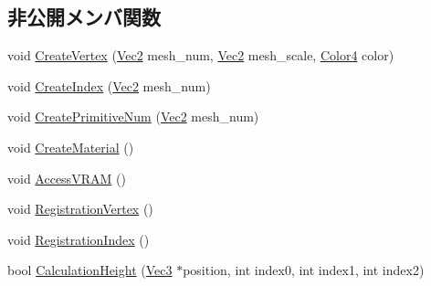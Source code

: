 \subsection*{非公開メンバ関数}
\begin{DoxyCompactItemize}
\item 
void \mbox{\hyperlink{class_mesh_plane_polygon_a50cdb56a3faa5d0bbb8ff75c3dcc2830}{Create\+Vertex}} (\mbox{\hyperlink{_vector3_d_8h_a5ef6e95dfc5f9d3820b71772d99bbc25}{Vec2}} mesh\+\_\+num, \mbox{\hyperlink{_vector3_d_8h_a5ef6e95dfc5f9d3820b71772d99bbc25}{Vec2}} mesh\+\_\+scale, \mbox{\hyperlink{_vector3_d_8h_a9c2339f516cf07ce4753b8a99fab3791}{Color4}} color)
\item 
void \mbox{\hyperlink{class_mesh_plane_polygon_ae7067eb849977a12554633e604806f85}{Create\+Index}} (\mbox{\hyperlink{_vector3_d_8h_a5ef6e95dfc5f9d3820b71772d99bbc25}{Vec2}} mesh\+\_\+num)
\item 
void \mbox{\hyperlink{class_mesh_plane_polygon_a0228c78794fe950ccb69b3a77a0239b8}{Create\+Primitive\+Num}} (\mbox{\hyperlink{_vector3_d_8h_a5ef6e95dfc5f9d3820b71772d99bbc25}{Vec2}} mesh\+\_\+num)
\item 
void \mbox{\hyperlink{class_mesh_plane_polygon_aea5b128def1dae8f391b80be25172b36}{Create\+Material}} ()
\item 
void \mbox{\hyperlink{class_mesh_plane_polygon_a30fd785154d01644ba76165673c5a7ac}{Access\+V\+R\+AM}} ()
\item 
void \mbox{\hyperlink{class_mesh_plane_polygon_ae3c43c5641c962ac848b3dadd3ea15e5}{Registration\+Vertex}} ()
\item 
void \mbox{\hyperlink{class_mesh_plane_polygon_aab346c974196e257399095dd914aaa51}{Registration\+Index}} ()
\item 
bool \mbox{\hyperlink{class_mesh_plane_polygon_a815092659c44ccd2f626445c7dd95c9e}{Calculation\+Height}} (\mbox{\hyperlink{_vector3_d_8h_ab16f59e4393f29a01ec8b9bbbabbe65d}{Vec3}} $\ast$position, int index0, int index1, int index2)
\end{DoxyCompactItemize}
